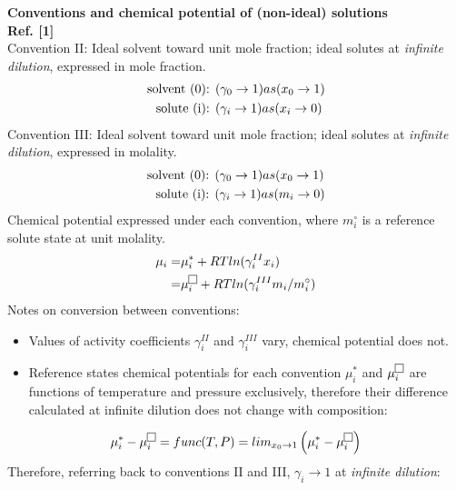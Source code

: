 \documentclass[12pt,a4paper,preview]{standalone}
\begin{document}
\textbf{Conventions and chemical potential of (non-ideal) solutions} \\
\textbf{Ref. [1]} \\
Convention II: Ideal solvent toward unit mole fraction; ideal solutes at \textit{infinite dilution}, expressed in mole fraction. \\
\begin{equation}
\begin{aligned}
\textnormal{solvent (0): } & (\gamma_0 \rightarrow 1) as  (x_0 \rightarrow 1)\\
\textnormal{solute (i): } & (\gamma_i \rightarrow 1) as (x_i \rightarrow 0)
\end{aligned}
\end{equation}
Convention III: Ideal solvent toward unit mole fraction; ideal solutes at \textit{infinite dilution}, expressed in molality. \\
\begin{equation}
\begin{aligned}
\textnormal{solvent (0): } & (\gamma_0 \rightarrow 1) as  (x_0 \rightarrow 1)\\
\textnormal{solute (i): } & (\gamma_i \rightarrow 1) as (m_i \rightarrow 0)
\end{aligned}
\end{equation}
Chemical potential expressed under each convention, where $m_i^{\circ}$ is a reference solute state at unit molality.
\begin{equation}
\begin{aligned}
\mu_i = & \mu_i^{*} + RTln(\gamma_i^{II} x_i) \\
	=	& \mu_i^{\fbox{}} + RTln(\gamma_i^{III} m_i/m_i^{\circ})
\end{aligned}
\end{equation}
Notes on conversion between conventions: 
\begin{itemize}
\item Values of activity coefficients $\gamma_i^{II}$ and $\gamma_i^{III}$ vary, chemical potential does not.
\item Reference states chemical potentials for each convention $\mu_i^{*}$ and $\mu_i^{\fbox{}}$  are functions of temperature and pressure exclusively, therefore their difference calculated at infinite dilution does not change with composition:
\end{itemize}
\[
\mu_i^{*} - \mu_i^{\fbox{}}  =  func(T,P) =  lim_{x_0 \rightarrow 1} \left( \mu_i^{*} - \mu_i^{\fbox{}}\right)
\]
Therefore, referring back to conventions II and III, $\gamma_i \rightarrow 1$ at \textit{infinite dilution}:
\end{document}
